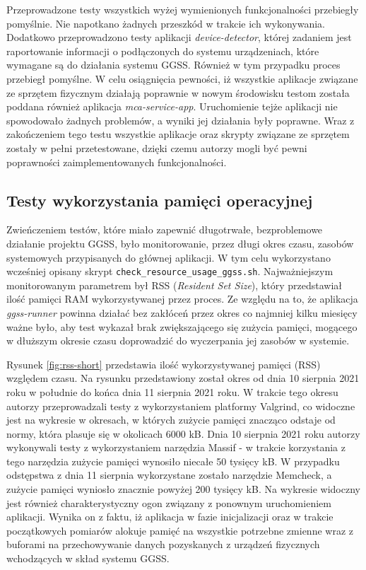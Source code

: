 Przeprowadzone testy wszystkich wyżej wymienionych funkcjonalności przebiegły pomyślnie. Nie napotkano żadnych przeszkód w trakcie ich wykonywania. Dodatkowo przeprowadzono testy aplikacji \emph{device-detector}, której zadaniem jest raportowanie informacji o podłączonych do systemu urządzeniach, które wymagane są do działania systemu GGSS. Również w tym przypadku proces przebiegł pomyślne. W celu osiągnięcia pewności, iż wszystkie aplikacje związane ze sprzętem fizycznym działają poprawnie w nowym środowisku testom została poddana również aplikacja \emph{mca-service-app}. Uruchomienie tejże aplikacji nie spowodowało żadnych problemów, a wyniki jej działania były poprawne. Wraz z zakończeniem tego testu wszystkie aplikacje oraz skrypty związane ze sprzętem zostały w pełni przetestowane, dzięki czemu autorzy mogli być pewni poprawności zaimplementowanych funkcjonalności.


\subsection{Testy wykorzystania pamięci operacyjnej}

Zwieńczeniem testów, które miało zapewnić długotrwałe, bezproblemowe działanie projektu GGSS, było monitorowanie, przez długi okres czasu, zasobów systemowych przypisanych do głównej aplikacji. W tym celu wykorzystano wcześniej opisany skrypt \lstinline{check_resource_usage_ggss.sh}. Najważniejszym monitorowanym parametrem był RSS (\emph{Resident Set Size}), który przedstawiał ilość pamięci RAM wykorzystywanej przez proces. Ze względu na to, że aplikacja \emph{ggss-runner} powinna działać bez zakłóceń przez okres co najmniej kilku miesięcy ważne było, aby test wykazał brak zwiększającego się zużycia pamięci, mogącego w dłuższym okresie czasu doprowadzić do wyczerpania jej zasobów w systemie.

Rysunek \ref{fig:rss-short} przedstawia ilość wykorzystywanej pamięci (RSS) względem czasu. Na rysunku przedstawiony został okres od dnia 10 sierpnia 2021 roku w południe do końca dnia 11 sierpnia 2021 roku. W trakcie tego okresu autorzy przeprowadzali testy z wykorzystaniem platformy Valgrind, co widoczne jest na wykresie w okresach, w których zużycie pamięci znacząco odstaje od normy, która plasuje się w okolicach 6000 kB. Dnia 10 sierpnia 2021 roku autorzy wykonywali testy z wykorzystaniem narzędzia Massif - w trakcie korzystania z tego narzędzia zużycie pamięci wynosiło niecałe 50 tysięcy kB. W przypadku odstępstwa z dnia 11 sierpnia wykorzystane zostało narzędzie Memcheck, a zużycie pamięci wyniosło znacznie powyżej 200 tysięcy kB. Na wykresie widoczny jest również charakterystyczny ogon związany z ponownym uruchomieniem aplikacji. Wynika on z faktu, iż aplikacja w fazie inicjalizacji oraz w trakcie początkowych pomiarów alokuje pamięć na wszystkie potrzebne zmienne wraz z buforami na przechowywanie danych pozyskanych z urządzeń fizycznych wchodzących w skład systemu GGSS.


